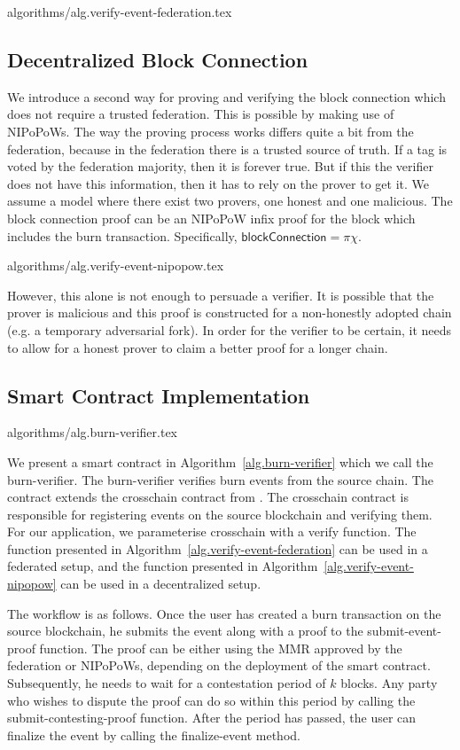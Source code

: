 {algorithms/alg.verify-event-federation.tex}

\subsection{Decentralized Block Connection}
We introduce a second way for proving and verifying the block connection which does not require a trusted federation. This is possible by making use of NIPoPoWs. The way the proving process works differs quite a bit from the federation, because in the federation there is a trusted source of truth. If a tag is voted by the federation majority, then it is forever true. But if this the verifier does not have this information, then it has to rely on the prover to get it. We assume a model where there exist two provers, one honest and one malicious. The block connection proof can be an NIPoPoW infix proof for the block which includes the burn transaction. Specifically, $\mathsf{blockConnection} = \pi\chi$.

{algorithms/alg.verify-event-nipopow.tex}

However, this alone is not enough to persuade a verifier. It is possible that the prover is malicious and this proof is constructed for a non-honestly adopted chain (e.g. a temporary adversarial fork). In order for the verifier to be certain, it needs to allow for a honest prover to claim a better proof for a longer chain.

\subsection{Smart Contract Implementation}
{algorithms/alg.burn-verifier.tex}

We present a smart contract in Algorithm~\ref{alg.burn-verifier} which we call the \textsf{burn-verifier}. The \textsf{burn-verifier} verifies burn events from the source chain. The contract extends the \textsf{crosschain} contract from \cite{pow-sidechains}. The \textsf{crosschain} contract is responsible for registering events on the source blockchain and verifying them. For our application, we parameterise \textsf{crosschain} with a \textsf{verify} function. The function presented in Algorithm~\ref{alg.verify-event-federation} can be used in a federated setup, and the function presented in Algorithm~\ref{alg.verify-event-nipopow} can be used in a decentralized setup.

The workflow is as follows. Once the user has created a burn transaction on the source blockchain, he submits the event along with a proof to the \textsf{submit-event-proof} function. The proof can be either using the MMR approved by the federation or NIPoPoWs, depending on the deployment of the smart contract. Subsequently, he needs to wait for a contestation period of $k$ blocks. Any party who wishes to dispute the proof can do so within this period by calling the \textsf{submit-contesting-proof} function. After the period has passed, the user can finalize the event by calling the \textsf{finalize-event} method.

